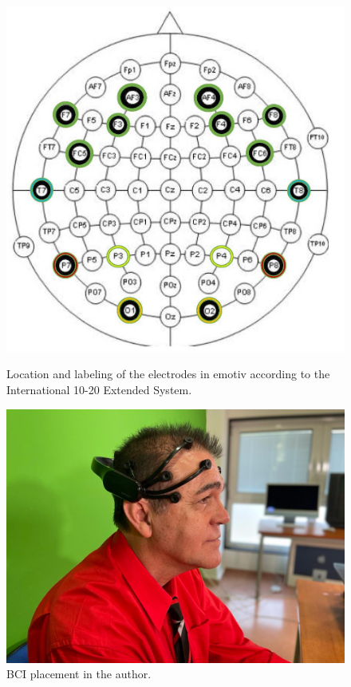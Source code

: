\documentclass[english]{textolivre}
\begin{document}
\begin{figure}[htbp]
 \centering
 \begin{minipage}{.45\textwidth}
 \includegraphics[width=\textwidth]{Fig2.png}
 \caption{Location and labeling of the electrodes in emotiv according to the International 10-20 Extended System.}
 \label{fig02}
 \end{minipage}%
 \qquad
 \begin{minipage}{0.45\textwidth}
 \includegraphics[width=\textwidth]{Fig3.png}
 \caption{BCI placement in the author.}
 \label{fig03}
 \end{minipage}%
\end{figure}
\end{document}
